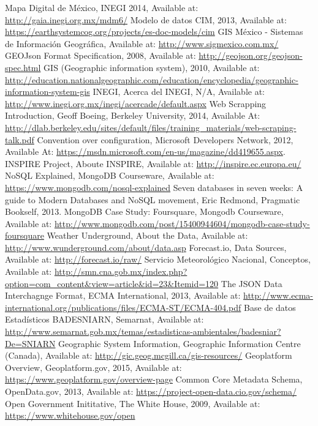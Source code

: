 \begin{thebibliography}{1}
		Mapa Digital de México, INEGI 2014, Available at: \url{http://gaia.inegi.org.mx/mdm6/}
	   Modelo de datos CIM, 2013, Available at: \url{https://earthsystemcog.org/projects/es-doc-models/cim}
		 GIS México - Sistemas de Información Geográfica, Available at: \url{http://www.sigmexico.com.mx/}
	     GEOJson Format Specification, 2008, Available at: \url{http://geojson.org/geojson-spec.html}
		 GIS (Geographic information system), 2010, Available at: \url{http://education.nationalgeographic.com/education/encyclopedia/geographic-information-system-gis}
		INEGI, Acerca del INEGI, N/A, Available at: \url{http://www.inegi.org.mx/inegi/acercade/default.aspx}
		Web Scrapping Introduction, Geoff Boeing, Berkeley University, 2014, Available At: \url{http://dlab.berkeley.edu/sites/default/files/training\_materials/web-scraping-talk.pdf}
		Convention over configuration, Microsoft Developers Network, 2012, Available At: \url{https://msdn.microsoft.com/en-us/magazine/dd419655.aspx}.
	    INSPIRE Project, Aboute INSPIRE, Available at: \url{http://inspire.ec.europa.eu/}
		NoSQL Explained, MongoDB Courseware, Available at: \url{https://www.mongodb.com/nosql-explained}
		Seven databases in seven weeks: A guide to Modern Databases and NoSQL movement, Eric Redmond, Pragmatic Bookself, 2013.
		MongoDB Case Study: Foursquare, Mongodb Courseware, Available at: \url{http://www.mongodb.com/post/15400944604/mongodb-case-study-foursquare}
		Weather Underground, About the Data, Available at: \url{http://www.wunderground.com/about/data.asp}
		Forecast.io, Data Sources, Available at: \url{http://forecast.io/raw/}
		Servicio Meteorológico Nacional, Conceptos, Available at: \url{http://smn.cna.gob.mx/index.php?option=com_content&view=article&id=23&Itemid=120}
    The JSON Data Interchagnge Format, ECMA International, 2013, Available at: \url{http://www.ecma-international.org/publications/files/ECMA-ST/ECMA-404.pdf}
    Base de datos Estadísticos BADESNIARN, Semarnat, Available at: \url{http://www.semarnat.gob.mx/temas/estadisticas-ambientales/badesniar?De=SNIARN}
    Geographic System Information, Geographic Information Centre (Canada), Available at: \url{http://gic.geog.mcgill.ca/gis-resources/}
    Geoplatform Overview, Geoplatform.gov, 2015, Available at:  \url{https://www.geoplatform.gov/overview-page}
    Common Core Metadata Schema, OpenData.gov, 2013, Available at: \url{https://project-open-data.cio.gov/schema/}
    Open Government Inititative, The White House, 2009, Available at: \url{https://www.whitehouse.gov/open}
    
\end{thebibliography}


